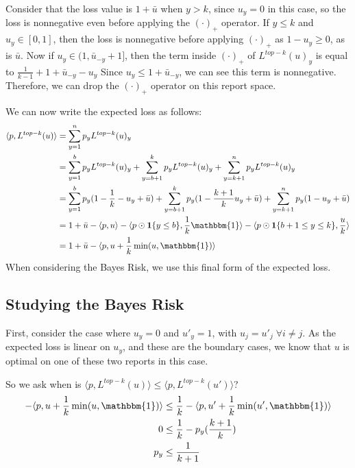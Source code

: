 \documentclass[12pt]{article}
\newcommand{\ubar}{\bar{u}}
\newcommand{\inprod}[2]{\langle #1, #2 \rangle}%
\newcommand{\ones}{\mathbbm{1}}
\newcommand{\Ind}[1]{\mathbf{1}\{#1\}}
\begin{document}
Consider that the loss value is $1 + \bar u$ when $y > k$, since $u_y = 0$ in this case, so the loss is nonnegative even before applying the $(\cdot)_+$ operator.
If $y \leq k$ and $u_y \in [0,1]$, then the loss is nonnegative before applying $(\cdot)_+$ as $1-u_y \geq 0$, as is $\bar u$.
Now if $u_y \in (1, \bar u_{-y} + 1]$, then the term inside $(\cdot)_+$ of $L^{top-k}(u)_y$ is equal to $\frac{1}{k-1} + 1 +  \ubar_{-y} - u_y $
Since $u_y \leq 1 +  \ubar_{-y}$, we can see this term is nonnegative.
Therefore, we can drop the $(\cdot)_+$ operator on this report space.

We can now write the expected loss as follows:
\begin{align*}
\inprod{p}{L^{top-k}(u)} &= \sum_{y=1}^n p_y L^{top-k}(u)_y \\
&= \sum_{y=1}^b p_y L^{top-k}(u)_y + \sum_{y=b+1}^k p_y L^{top-k}(u)_y + \sum_{y=k+1}^n p_y L^{top-k}(u)_y\\
&= \sum_{y=1}^b p_y (1 - \frac 1 k - u_y + \ubar) + \sum_{y=b+1}^k p_y (1 - \frac{k+1} k u_y + \ubar) + \sum_{y=k+1}^n p_y(1 - u_y + \ubar)\\
&= 1 + \ubar - \inprod{p}{u} - \inprod{p \odot \Ind{y \leq b}}{\frac 1 k \ones} - \inprod{p \odot \Ind{b+1 \leq y \leq k}}{ \frac u k}\\
&= 1 + \ubar - \inprod{p}{u + \frac 1 k \min(u, \ones)}
\end{align*}
When considering the Bayes Risk, we use this final form of the expected loss.

\subsection{Studying the Bayes Risk}
First, consider the case where $u_y = 0$ and $u'_y = 1$, with $u_j = u'_j \;\forall i \neq j$.
As the expected loss is linear on $u_y$, and these are the boundary cases, we know that $u$ is optimal on one of these two reports in this case.

So we ask when is $\inprod{p}{L^{top-k}(u)} \leq \inprod{p}{L^{top-k}(u')}$?
\begin{align*}
- \inprod{p}{u + \frac 1 k \min(u, \ones)} &\leq \frac {1}{k} - \inprod{p}{u' + \frac 1 k \min(u', \ones)}\\
0 &\leq \frac{1}{k} - p_y(\frac{k+1}{k})\\
p_y &\leq \frac{1}{k+1}
\end{align*}
\end{document}
